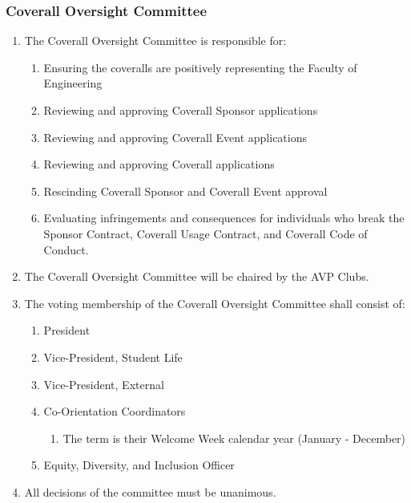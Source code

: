 \hypertarget{coverall-oversight-committee}{%
 \subsubsection{Coverall Oversight Committee}
 \label{coverall-oversight-committee}}

\begin{enumerate}
 \item
  The Coverall Oversight Committee is responsible for:

  \begin{enumerate}
   \item
    Ensuring the coveralls are positively representing the Faculty of
    Engineering
   \item
    Reviewing and approving Coverall Sponsor applications
   \item
    Reviewing and approving Coverall Event applications
   \item
    Reviewing and approving Coverall applications
   \item
    Rescinding Coverall Sponsor and Coverall Event approval
   \item
    Evaluating infringements and consequences for individuals who break
    the Sponsor Contract, Coverall Usage Contract, and Coverall Code of
    Conduct.
  \end{enumerate}
 \item
  The Coverall Oversight Committee will be chaired by the AVP Clubs.
 \item
  The voting membership of the Coverall Oversight Committee shall
  consist of:

  \begin{enumerate}
   \item
    President
   \item
    Vice-President, Student Life
   \item
    Vice-President, External
   \item
    Co-Orientation Coordinators
    \begin{enumerate}
     \item
      The term is their Welcome Week calendar year (January - December)
    \end{enumerate}
   \item
    Equity, Diversity, and Inclusion Officer
  \end{enumerate}
 \item
  All decisions of the committee must be unanimous.
\end{enumerate}

